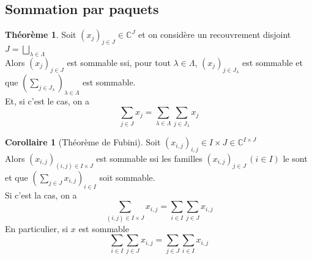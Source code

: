 \documentclass[10pt,a4paper]{article}
\theoremstyle{definition}
\newtheorem{theorem}[proposition]{Théorème}
\newtheorem{corollaire}[proposition]{Corollaire}
\begin{document}
\subsection{Sommation par paquets}
\begin{theorem}
Soit $(x_j)_{j \in J} \in \mathbb{C}^J$ et on considère un recouvrement disjoint $J = \bigsqcup\limits_{\lambda \in \Lambda}$ \\
Alors $(x_j)_{j \in J}$ est sommable ssi, pour tout $\lambda \in \Lambda$, $(x_j)_{j \in J_\lambda}$ est sommable et que $(\sum\limits_{j \in J_\lambda})_{\lambda \in \Lambda}$ est sommable. \\
Et, si c'est le cas, on a
\[ \sum_{j \in J} x_j = \sum_{\lambda \in \Lambda} \sum_{j \in J_\lambda} x_j\]
\end{theorem}
\begin{corollaire}[Théorème de Fubini]
Soit $(x_{i, j})_{i, j} \in I \times J \in \mathbb{C}^{I \times J}$ \\
Alors $(x_{i, j})_{(i, j) \in I \times J}$ est sommable ssi les familles $(x_{i, j})_{j \in J} \, (i \in I)$ le sont et que $(\sum\limits_{j \in J} x_{i, j})_{i \in I}$ soit sommable. \\
Si c'est la cas, on a
\[\sum_{(i, j) \in I \times J} x_{i, j} = \sum_{i \in I} \sum_{j \in J} x_{i, j}\]
En particulier, si $x$ est sommable
\[ \sum_{i \in I} \sum_{j \in J} x_{i, j} = \sum_{j \in J} \sum_{i \in I} x_{i, j}\]
\end{corollaire}
\end{document}
